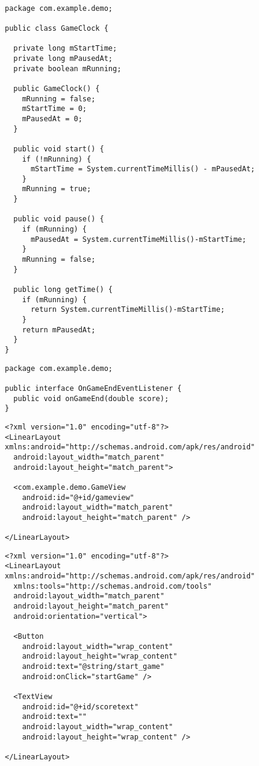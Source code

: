 \begin{lstlisting}[caption=GameClock.java]

package com.example.demo;

public class GameClock {

  private long mStartTime;
  private long mPausedAt;
  private boolean mRunning;
	
  public GameClock() {
    mRunning = false;
    mStartTime = 0;
    mPausedAt = 0;
  }
	
  public void start() {
    if (!mRunning) {
      mStartTime = System.currentTimeMillis() - mPausedAt;	
    }
    mRunning = true;
  }
	
  public void pause() {
    if (mRunning) {
      mPausedAt = System.currentTimeMillis()-mStartTime;
    }
    mRunning = false;
  }
	
  public long getTime() {
    if (mRunning) {
      return System.currentTimeMillis()-mStartTime;
    }
    return mPausedAt;
  }
}
\end{lstlisting}

\begin{lstlisting}[caption=OnGameEndEventListener.java]
package com.example.demo;

public interface OnGameEndEventListener {
  public void onGameEnd(double score);
}

\end{lstlisting}

\begin{lstlisting}[caption=game\_layout.xml]
<?xml version="1.0" encoding="utf-8"?>
<LinearLayout xmlns:android="http://schemas.android.com/apk/res/android"
  android:layout_width="match_parent"
  android:layout_height="match_parent">

  <com.example.demo.GameView
    android:id="@+id/gameview"
    android:layout_width="match_parent"
    android:layout_height="match_parent" />

</LinearLayout>

\end{lstlisting}

\begin{lstlisting}[caption=main\_layout.xml]
<?xml version="1.0" encoding="utf-8"?>
<LinearLayout xmlns:android="http://schemas.android.com/apk/res/android"
  xmlns:tools="http://schemas.android.com/tools"
  android:layout_width="match_parent"
  android:layout_height="match_parent"
  android:orientation="vertical">

  <Button
    android:layout_width="wrap_content"
    android:layout_height="wrap_content"
    android:text="@string/start_game"
    android:onClick="startGame" />
    
  <TextView
    android:id="@+id/scoretext"
    android:text=""
    android:layout_width="wrap_content"
    android:layout_height="wrap_content" />

</LinearLayout>
\end{lstlisting}

